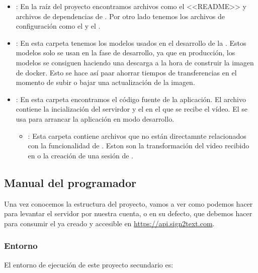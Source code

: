 \begin{itemize}

  \item \prog{/}: En la raíz del proyecto encontramos archivos como el <<README>> y archivos de dependencias de . Por otro lado tenemos los archivos de configuración como el  y el .

  \item {}: En esta carpeta tenemos los modelos usados en el desarrollo de la . Estos modelos solo se usan en la fase de desarrollo, ya que en producción, los modelos se consiguen haciendo una descarga a la hora de construir la imagen de docker. Esto se hace así paar ahorrar tiempos de transferencias en el momento de subir o bajar una actualización de la imagen.

  \item {}: En esta carpeta encontramos el código fuente de la aplicación. El archivo  contiene la incialización del servirdor y el  en el que se recibe el vídeo. El   se usa para arrancar la aplicación en modo desarrollo.
        \begin{itemize}
          \item {}: Esta carpeta contiene archivos que no están directamnte relacionados con la funcionalidad de . Eston son la transformación del video recibido en  o la creación de una sesión de .
        \end{itemize}

\end{itemize}

\subsection{Manual del programador}

Una vez conocemos la estructura del proyecto, vamos a ver como podemos hacer para levantar el servidor por nuestra cuenta, o en su defecto, que debemos hacer para consumir el  ya creado y accesible en \url{https://api.sign2text.com}.

\subsubsection{Entorno}

El entorno de ejecución de este proyecto secundario es:


